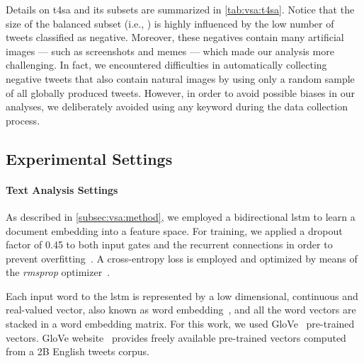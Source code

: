 Details on \gls{t4sa} and its subsets are summarized in \ref{tab:vsa:t4sa}.
Notice that the size of the balanced subset (i.e., {\BTSA}) is highly influenced by the low number of tweets classified as negative.
Moreover, these negatives contain many artificial images --- such as screenshots and memes --- which made our analysis more challenging.
In fact, we encountered difficulties in automatically collecting negative tweets that also contain natural images by using only a random sample of all globally produced tweets.
However, in order to avoid possible biases in our analyses, we deliberately avoided using any keyword during the data collection process.

\subsection{Experimental Settings}
\label{exp:visual}

\paragraph{Text Analysis Settings}
As described in \ref{subsec:vsa:method}, we employed a bidirectional \gls{lstm} to learn a document embedding into a feature space.
For training, we applied a dropout factor of 0.45 to both input gates and the recurrent connections in order to prevent overfitting~\cite{gal2016theoretically}.
A cross-entropy loss is employed and optimized by means of the \emph{rmsprop} optimizer~\cite{tieleman2012lecture}.

Each input word to the \gls{lstm} is represented by a low dimensional, continuous and real-valued vector, also known as word embedding~\cite{mikolov2013distributed}, and all the word vectors are stacked in a word embedding matrix.
For this work, we used GloVe~\cite{pennington2014glove} pre-trained vectors. %
GloVe website~ provides freely available pre-trained vectors computed from a 2B English tweets corpus.

